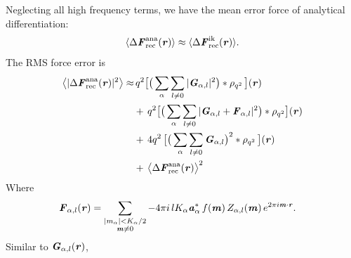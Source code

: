 \documentclass[journal=jacsat,manuscript=article]{achemso}
\renewcommand{\v}[1]{\textbf{\textit{#1}}}
\begin{document}
Neglecting all high frequency terms, we have the mean error force of
analytical differentiation:
\begin{align}\label{eqn:ana.meanf}
  \langle \Delta\v F_{\textrm{rec}}^{\textrm{ana}}(\v r)\rangle
  \approx
  \langle \Delta\v F_{\textrm{rec}}^{\textrm{ik}}(\v r)\rangle.
\end{align}
The RMS force error is 
\begin{align}\nonumber
  \big\langle
  \vert \Delta\v F_{\textrm{rec}}^{\textrm{ana}}(\v r)\vert^2
  \big\rangle
  \approx&\,
  q^2
  \big[
  \big(
  \sum_{\alpha} \sum_{l\neq 0}
  \vert \v G_{\alpha,l}\vert^2
  \big)
  \ast \rho_{q^2}
  \,\big] (\v r) \\\nonumber
  & +\,
  q^2
  \big[
  \big(
  \sum_{\alpha}\sum_{l\neq 0}
  \vert
  \v G_{\alpha,l} + \v F_{\alpha,l}\vert^2
  \big)
  \ast \rho_{q^2}
  \big]
  (\v r) \\ \nonumber
  & +\,
  4q^2\,
  \big[
  \big(
  \sum_{\alpha} \sum_{l\neq 0}  
  \v G_{\alpha,l}
  \big)^2
  \ast \rho_{q^2}\,
  \big] (\v r) \\\label{eqn:ana.error}
  & +\,
  \big\langle \Delta\v F_{\textrm{rec}}^{\textrm{ana}}(\v r)\big\rangle ^2
\end{align}
Where
\begin{align}
  \v F_{\alpha,l} (\v r)
  &=
  \sum_{
    \begin{subarray}{c}
      \vert m_{\alpha}\vert < K_\alpha/2\\
      \v m\neq 0
    \end{subarray}}
  -4 \pi i\, l K_\alpha \v a^\ast_\alpha\,f(\v m)\,
  Z_{\alpha,l}(\v m)\,
  e^{2\pi i\v m\cdot \v r}.
\end{align}
Similar to $\v G_{\alpha,l}(\v r)$,
\end{document}
